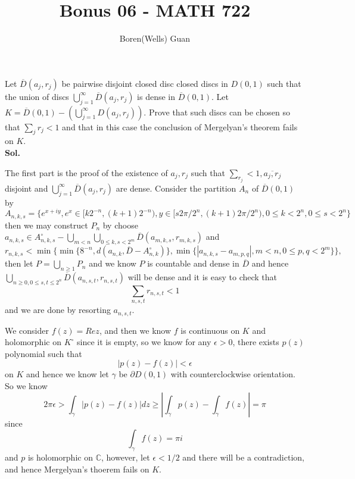 \documentclass[lang=en,11pt,a4paper,citestyle =authoryear]{elegantpaper}
\title{Bonus 06 - MATH 722}
\author{Boren(Wells) Guan}
\newcommand{\C}{\mathbb{C}}
\begin{document}
\maketitle

Let $\overline{D}(a_j,r_j)$ be pairwise disjoint closed disc closed discs in $D(0,1)$ such that the union of discs $\bigcup_{j=1}^{\infty} \overline{D}(a_j,r_j)$ is dense in $\overline{D}(0,1)$. Let $K = \overline{D}(0,1)-(\bigcup_{j=1}^{\infty} D(a_j,r_j))$. Prove that such discs can be chosen so that $\sum_j r_j < 1$ and that in this case the conclusion of Mergelyan's theorem fails on $K$.
\vspace{0.5em}\\
\textbf{Sol.} \par
The first part is the proof of the existence of $a_j,r_j$ such that $\sum\limits_{r_j} < 1, \overline{a_j,r_j}$ disjoint and $\bigcup_{j=1}^{\infty}\overline{D}(a_j,r_j)$ are dense. Consider the partition $A_n$ of $\overline{D}(0,1)$ by
\[
A_{n,k,s} = \{e^{x+iy}, e^x\in [k2^{-n},(k+1)2^{-n}), y\in[s2\pi/2^n, (k+1)2\pi/2^n), 0\leq k < 2^n, 0\leq s < 2^n\}
\]
then we may construct $P_n$ by choose $a_{n,k,s} \in A_{n,k,s}^{\circ} - \bigcup_{m<n} \bigcup_{0\leq k,s < 2^m} \overline{D}(a_{m,k,s},r_{m,k,s})$ and \[r_{n,k,s} < \min\{\min\{8^{-n}, d(a_{n,k},\overline{D} - A_{n,k}^{\circ})\}, \min\{|a_{n,k,s}-a_{m,p,q}|, m<n, 0\leq p,q < 2^m\}\},\] then let $P = \bigcup_{n\geq 1}P_n$ and we know $P$ is countable and dense in $\overline{D}$ and hence $\bigcup_{n\geq 0, 0\leq s,t\leq 2^n}\overline{D}(a_{n,s,t},r_{n,s,t})$ will be dense and it is easy to check that
\[
\sum_{n,s,t} r_{n,s,t} < 1
\]
and we are done by resorting $a_{n,s,t}$.\par
We consider $f(z) = Re z$, and then we know $f$ is continuous on $K$ and holomorphic on $K^{\circ}$ since it is empty, so we know for any $\epsilon>0$, there exists $p(z)$ polynomial such that
\[|p(z) - f(z)| < \epsilon\] on $K$ and hence we know let $\gamma$ be $\partial D(0,1)$ with counterclockwise orientation. So we know
\[
2\pi \epsilon > \int_{\gamma}|p(z)-f(z)|dz \geq |\int_{\gamma}p(z) - \int_{\gamma}f(z)| = \pi
\]
since
\[
\int_{\gamma}f(z) = \pi i 
\]
and $p$ is holomorphic on $\C$, however, let $\epsilon < 1/2$ and there will be a contradiction, and hence Mergelyan's thoerem fails on $K$.
\vspace{0.5em}
\addappheadtotoc
\end{document}
